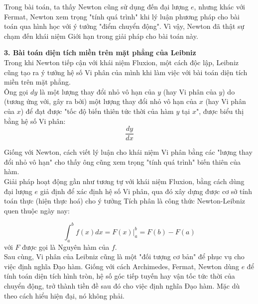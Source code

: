 \documentclass[a4paper,12pt]{article}
\begin{document}
Trong bài toán, ta thấy Newton cũng sử dụng đến đại lượng $e$, nhưng khác với Fermat, Newton xem trọng "tính quá trình" khi lý luận phương pháp cho bài toán qua hình học với ý tưởng "điểm chuyển động". Vì vậy, Newton đã thật sự chạm đến khái niệm Giới hạn trong giải pháp cho bài toán này.\\
\newline

\textbf{3. Bài toán diện tích miền trên mặt phẳng của Leibniz}\\

Trong khi Newton tiếp cận với khái niệm Fluxion, một cách độc lập, Leibniz cũng tạo ra ý tưởng hệ số Vi phân của mình khi làm việc với bài toán diện tích miền trên mặt phẳng.\\ 

Ông gọi $dy$ là một lượng thay đổi nhỏ vô hạn của $y$ (hay Vi phân của $y$) do (tương ứng với, gây ra bởi) một lượng thay đổi nhỏ vô hạn của $x$ (hay Vi phân của $x$) để đạt được "tốc độ biến thiên tức thời của hàm $y$ tại $x$", được biểu thị bằng hệ số Vi phân: $$\frac{dy}{dx}$$

Giống với Newton, cách viết lý luận cho khái niệm Vi phân bằng các "lượng thay đổi nhỏ vô hạn" cho thấy ông cũng xem trọng "tính quá trình" biến thiên của hàm.\\

Giải pháp hoạt động gần như tương tự với khái niệm Fluxion, bằng cách dùng đại lượng $e$ giả định để xác định hệ số Vi phân, qua đó xây dựng được cơ sở tính toán thực (hiện thực hoá) cho ý tưởng Tích phân là công thức Newton-Leibniz quen thuộc ngày nay:

$$ \int_{a}^{b} f(x)dx = F(x) \Big|_{a}^{b} = F(b) - F(a) $$
với $F$ được gọi là Nguyên hàm của $f$.\\

Sau cùng, Vi phân của Leibniz cũng là một "đối tượng cơ bản" để phục vụ cho việc định nghĩa Đạo hàm. Giống với cách Archimedes, Fermat, Newton dùng $e$ để tính toán diện tích hình tròn, hệ số góc tiếp tuyến hay vận tốc tức thời của chuyển động, trở thành tiền đề sau đó cho việc định nghĩa Đạo hàm. Mặc dù theo cách hiểu hiện đại, nó không phải.\\
\end{document}
